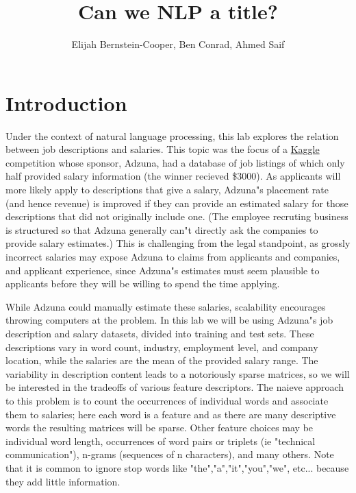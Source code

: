 \documentclass[12pt]{article}
\begin{document}
\title{Can we NLP a title?}

\author{
Elijah Bernstein-Cooper, Ben Conrad, Ahmed Saif
}
\maketitle

\section{Introduction}

    Under the context of natural language processing, this lab explores the
    relation between job descriptions and salaries.  This topic was the focus
    of a \href{http://www.kaggle.com/c/job-salary-prediction}{Kaggle}
    competition whose sponsor, Adzuna, had a database of job listings of which
    only half provided salary information (the winner recieved \$3000).  As
    applicants will more likely apply to descriptions that give a salary,
    Adzuna"s placement rate (and hence revenue) is improved if they can provide
    an estimated salary for those descriptions that did not originally include
    one.  (The employee recruting business is structured so that Adzuna
    generally can"t directly ask the companies to provide salary estimates.)
    This is challenging from the legal standpoint, as grossly incorrect
    salaries may expose Adzuna to claims from applicants and companies, and
    applicant experience, since Adzuna"s estimates must seem plausible to
    applicants before they will be willing to spend the time applying.

    While Adzuna could manually estimate these salaries, scalability encourages
    throwing computers at the problem.  In this lab we will be using Adzuna"s
    job description and salary datasets, divided into training and test sets.
    These descriptions vary in word count, industry, employment level, and
    company location, while the salaries are the mean of the provided salary
    range.  The variability in description content leads to a notoriously
    sparse matrices, so we will be interested in the tradeoffs of various
    feature descriptors.  The naieve approach to this problem is to count the
    occurrences of individual words and associate them to salaries; here each
    word is a feature and as there are many descriptive words the resulting
    matrices will be sparse.  Other feature choices may be individual word
    length, occurrences of word pairs or triplets (ie "technical
    communication"), n-grams (sequences of n characters), and many others.
    Note that it is common to ignore stop words like "the","a","it","you","we",
    etc... because they add little information.
\end{document}
